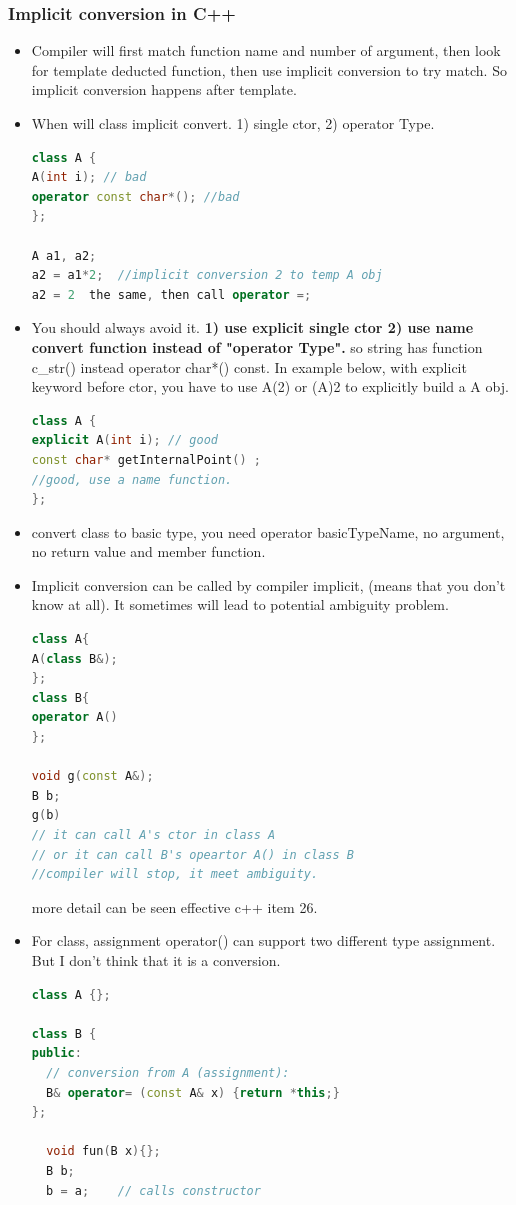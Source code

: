 \documentclass[a4paper,12pt,twoside]{book}
\begin{document}
\subsubsection{Implicit conversion in C++}
\begin{itemize}
\item Compiler will first match function name and number of argument, then look for template deducted function, then use implicit conversion to try match. So implicit conversion happens after template.

\item When will class implicit convert. 1) single ctor, 2) operator Type.
\begin{lstlisting}[frame=single, language=c++]
class A {
A(int i); // bad
operator const char*(); //bad
};

A a1, a2;
a2 = a1*2;  //implicit conversion 2 to temp A obj
a2 = 2  the same, then call operator =;
\end{lstlisting}
\item You should always avoid it. \textbf{1) use explicit single ctor 2) use name convert function instead of  "operator Type".} so string has function c\_str() instead operator char*() const. In example below, with explicit keyword before ctor,  you have to use A(2) or (A)2 to explicitly build a A obj.
\begin{lstlisting}[frame=single, language=c++]
class A {
explicit A(int i); // good
const char* getInternalPoint() ;
//good, use a name function.
};
\end{lstlisting}


\item  convert class to basic type, you need operator basicTypeName, no argument, no return value and member function.

\item Implicit conversion can be called by compiler implicit, (means that you don't know at all). It sometimes will lead to potential ambiguity problem.
\begin{lstlisting}[frame=single, language=c++]
class A{
A(class B&);
};
class B{
operator A()
};

void g(const A&);
B b;
g(b)
// it can call A's ctor in class A
// or it can call B's opeartor A() in class B
//compiler will stop, it meet ambiguity.
\end{lstlisting}
more detail can be seen effective c++ item 26.

\item For class, assignment operator() can support two different type assignment. But I don't think that it is a conversion.
\begin{lstlisting}[frame=single, language=c++]
class A {};

class B {
public:
  // conversion from A (assignment):
  B& operator= (const A& x) {return *this;}
};

  void fun(B x){};
  B b;
  b = a;    // calls constructor
\end{lstlisting}

\end{itemize}
\end{document}
